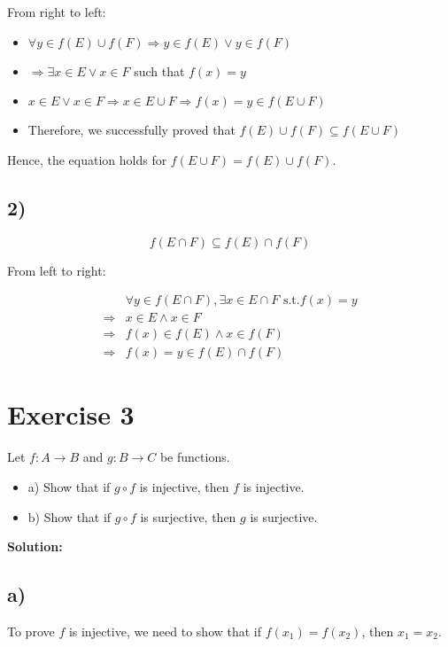 \documentclass{article}
\begin{document}
From right to left:

\begin{itemize}
    \item $\forall y \in f(E) \cup f(F) \Rightarrow y \in f(E) \lor y \in f(F)$
    \item $\Rightarrow \exists x \in E \lor x \in F$ such that $f(x) = y$
    \item $x \in E \lor x \in F \Rightarrow x \in E \cup F \Rightarrow f(x) = y \in f(E \cup F)$
    \item Therefore, we successfully proved that $f(E) \cup f(F) \subseteq f(E \cup F)$
\end{itemize}

Hence, the equation holds for $f(E \cup F) = f(E) \cup f(F)$.

\subsection*{2)}

$$f(E \cap F) \subseteq f(E) \cap f(F)$$

From left to right:

\begin{align*}
    & \forall y \in f(E \cap F), \exists x \in E \cap F \text{ s.t.} f(x) = y \\
    \Rightarrow & x \in E \land x \in F \\
    \Rightarrow & f(x) \in f(E) \land x \in f(F) \\
    \Rightarrow & f(x) = y \in f(E) \cap f(F)
\end{align*}

\section*{Exercise 3}

Let $f: A \to B$ and $g: B \to C$ be functions.
\begin{itemize}
    \item a) Show that if $g \circ f$ is injective, then $f$ is injective.
    \item b) Show that if $g \circ f$ is surjective, then $g$ is surjective.
\end{itemize}

\textbf{Solution:}

\subsection*{a)}

To prove $f$ is injective, we need to show that if $f(x_1) = f(x_2)$, then $x_1 = x_2$.
\end{document}
